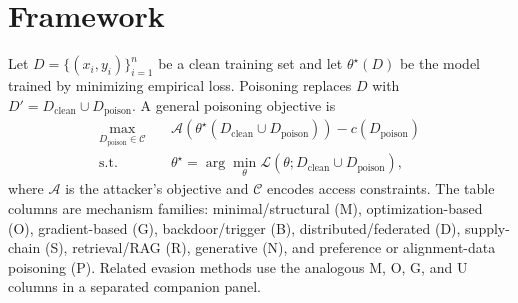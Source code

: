 \documentclass[conference]{IEEEtran}
\begin{document}
\section{Framework}

Let \(D=\{(x_i,y_i)\}_{i=1}^{n}\) be a clean training set and let \(\theta^\star(D)\) be the model trained by minimizing empirical loss. Poisoning replaces \(D\) with \(D'=D_{\mathrm{clean}}\cup D_{\mathrm{poison}}\). A general poisoning objective is
\begin{equation}
\begin{aligned}
 \max_{D_{\mathrm{poison}}\in\mathcal{C}}\quad
   & \mathcal{A}(\theta^\star(D_{\mathrm{clean}}\cup D_{\mathrm{poison}}))
   - c(D_{\mathrm{poison}})\\
 \text{s.t.}\quad
   & \theta^\star=\arg\min_{\theta}\mathcal{L}(\theta;D_{\mathrm{clean}}\cup D_{\mathrm{poison}}),
\end{aligned}
\end{equation}
where \(\mathcal{A}\) is the attacker's objective and \(\mathcal{C}\) encodes access constraints. The table columns are mechanism families: minimal/structural (M), optimization-based (O), gradient-based (G), backdoor/trigger (B), distributed/federated (D), supply-chain (S), retrieval/RAG (R), generative (N), and preference or alignment-data poisoning (P). Related evasion methods use the analogous M, O, G, and U columns in a separated companion panel.
\end{document}
